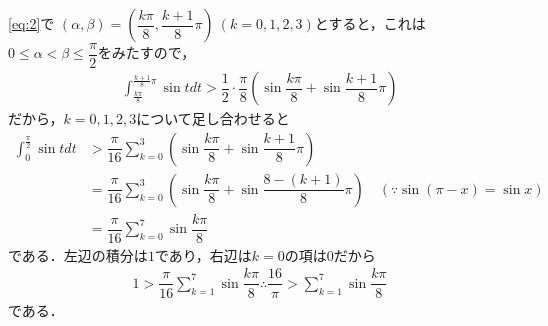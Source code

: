 \documentclass[../../main.tex]{subfiles}
\begin{document}
\cref{eq:2}で $(\alpha, \beta) = \left( \dfrac{k\pi}{8}, \dfrac{k+1}{8}\pi \right) \ (k=0,1,2,3)$とすると，これは$0 \le \alpha < \beta \le \dfrac{\pi}{2}$をみたすので，
\begin{align}
  \int_{\frac{k\pi}{8}}^{\frac{k+1}{8}\pi} \sin t dt > \dfrac{1}{2} \cdot \dfrac{\pi}{8} \left( \sin\dfrac{k\pi}{8} + \sin\dfrac{k+1}{8}\pi \right)
\end{align}
だから，$k=0,1,2,3$について足し合わせると
\begin{align}
  \int_0^{\frac{\pi}{2}} \sin t dt
  &> \dfrac{\pi}{16} \sum_{k=0}^{3}\left(\sin\dfrac{k\pi}{8} + \sin\dfrac{k+1}{8}\pi\right) \\
  &= \dfrac{\pi}{16} \sum_{k=0}^{3}\left(\sin\dfrac{k\pi}{8} + \sin\dfrac{8-(k+1)}{8}\pi\right) \quad (\because \sin(\pi-x)=\sin x) \\
  &= \dfrac{\pi}{16} \sum_{k=0}^{7} \sin\dfrac{k\pi}{8}
\end{align}
である．左辺の積分は$1$であり，右辺は$k=0$の項は$0$だから
\begin{align}
  1 > \dfrac{\pi}{16} \sum_{k=1}^{7} \sin\dfrac{k\pi}{8}
  \therefore
  \dfrac{16}{\pi} > \sum_{k=1}^7 \sin\dfrac{k\pi}{8}
\end{align}
である．
\end{document}
